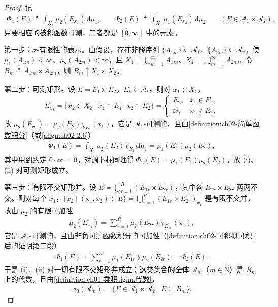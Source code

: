 \documentclass[../../main.tex]{subfiles}%
\begin{document}
\begin{proof}
记
\begin{align*}
\Phi_1(E)\triangleq\int_{X_1}\mu_2(E_{x_1})\,\mathrm{d}\mu_1,\qquad
\Phi_2(E)\triangleq\int_{X_2}\mu_1(E_{x_2})\,\mathrm{d}\mu_2\qquad(E\in\mathscr A_1\times\mathscr A_2),
\end{align*}
只要相应的被积函数可测，二者都是 $[0,\infty]$ 中的元素。

第一步：$\sigma$-有限性的表示。由假设，存在非降序列 $\{A_{1m}\}\subseteq\mathscr A_1$、$\{A_{2m}\}\subseteq\mathscr A_2$，使 $\mu_1(A_{1m})<\infty$、$\mu_2(A_{2m})<\infty$，且 $X_1=\bigcup_{m=1}^\infty A_{1m}$、$X_2=\bigcup_{m=1}^\infty A_{2m}$。令 $B_m\triangleq A_{1m}\times A_{2m}$，则 $B_m\uparrow X_1\times X_2$。

第二步：可测矩形。设 $E=E_1\times E_2$，$E_k\in\mathscr A_k$。则对 $x_1\in X_1$，
\begin{align*}
E_{x_1}=\{x_2\in X_2\mid x_1\in E_1,\ x_2\in E_2\}=
\begin{cases}
E_2, & x_1\in E_1,\\
\varnothing, & x_1\notin E_1,
\end{cases}
\end{align*}
故 $\mu_2(E_{x_1})=\mu_2(E_2)\chi_{E_1}(x_1)$，它是 $\mathscr A_1$-可测的，且由\cref{definition:ch02-简单函数积分}（或\eqref{align:ch02-2.6}）
\begin{align*}
\Phi_1(E)=\int_{X_1}\mu_2(E_2)\chi_{E_1}\,\mathrm{d}\mu_1=\mu_1(E_1)\mu_2(E_2),
\end{align*}
其中用到约定 $0\cdot\infty=0$。对调下标同理得 $\Phi_2(E)=\mu_1(E_1)\mu_2(E_2)$。故 (i)、(ii) 对可测矩形成立。

第三步：有限不交矩形并。设 $E=\bigcup_{r=1}^R(E_{1r}\times E_{2r})$，其中各 $E_{1r}\times E_{2r}$ 两两不交。则对每个 $x_1$，$\{x_2\mid(x_1,x_2)\in E\}=\bigcup_{r=1}^R(E_{1r}\times E_{2r})_{x_1}$ 是有限不交并，故由 $\mu_2$ 的有限可加性
\begin{align*}
\mu_2(E_{x_1})=\sum_{r=1}^R\mu_2(E_{2r})\chi_{E_{1r}}(x_1),
\end{align*}
它是 $\mathscr A_1$-可测的，且由非负可测函数积分的可加性（\cref{definition:ch02-可积拟可积}后的证明第二段）
\begin{align*}
\Phi_1(E)=\sum_{r=1}^R\mu_1(E_{1r})\mu_2(E_{2r})=\Phi_2(E).
\end{align*}
于是 (i)、(ii) 对一切有限不交矩形并成立；这类集合的全体 $\mathscr A_m$（$m\in\mathbb N$）是 $B_m$ 上的代数，且由\cref{definition:ch01-乘积sigma代数}，
\begin{align*}
\sigma_0(\mathscr A_m)=\{E\in\mathscr A_1\times\mathscr A_2\mid E\subseteq B_m\}.
\end{align*}


\end{proof}
\end{document}
